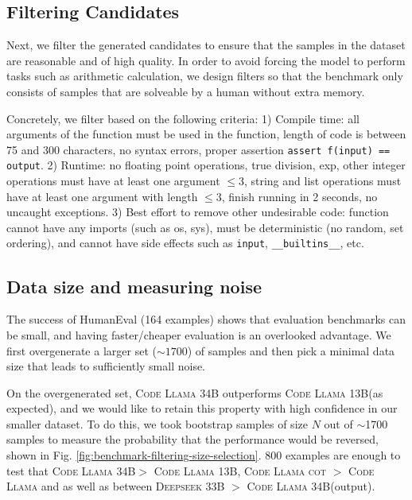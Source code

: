 \documentclass{article} %
\newcommand{\codellamamed}{\textsc{Code Llama 13B}\xspace}
\newcommand{\codellamalarge}{\textsc{Code Llama 34B}\xspace}
\begin{document}
\subsection{Filtering Candidates} \label{subsec:filtering-candidates}
Next, we filter the generated candidates to ensure that the samples in the dataset are reasonable and of high quality. In order to avoid forcing the model to perform tasks such as arithmetic calculation, we design filters so that the benchmark only consists of samples that are solveable by a human without extra memory.

Concretely, we filter based on the following criteria: 1) Compile time: all arguments of the function must be used in the function, length of code is between 75 and 300 characters, no syntax errors, proper assertion \texttt{assert f(input) == output}. 2) Runtime: no floating point operations, true division, exp, other integer operations must have at least one argument $\leq 3$, string and list operations must have at least one argument with length $\leq 3$, finish running in 2 seconds, no uncaught exceptions. 3) Best effort to remove other undesirable code: function cannot have any imports (such as os, sys), must be deterministic (no random, set ordering), and cannot have side effects such as \texttt{input}, \texttt{\_\_builtins\_\_}, etc.

\subsection{Data size and measuring noise} \label{subsec:data-size-noise}
The success of HumanEval (164 examples) shows that evaluation benchmarks can be small, and having faster/cheaper evaluation is an overlooked advantage. We first overgenerate a larger set ($\sim1700$) of samples and then pick a minimal data size that leads to sufficiently small noise. 


On the overgenerated set, \codellamalarge outperforms \codellamamed (as expected), and we would like to retain this property with high confidence in our smaller dataset. To do this, we took bootstrap samples of size $N$ out of $\sim$1700 samples to measure the probability that the performance would be reversed, shown in Fig. \ref{fig:benchmark-filtering-size-selection}. 800 examples are enough to test that \codellamalarge $>$ \codellamamed, \textsc{Code Llama cot} $>$ \textsc{Code Llama} and  as well as between \textsc{Deepseek 33B} $>$ \codellamalarge (output).
\end{document}
